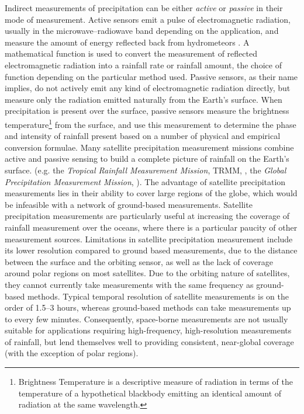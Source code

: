 Indirect measurements of precipitation can be either \textit{active} or \textit{passive} in their mode of measurement. Active sensors emit a pulse of electromagnetic radiation, usually in the microwave--radiowave band depending on the application, and measure the amount of energy reflected back from hydrometeors \citep{fabry2015radar}. A mathematical function is used to convert the measurement of reflected electromagnetic radiation into a rainfall rate or rainfall amount, the choice of function depending on the particular method used. Passive sensors, as their name implies, do not actively emit any kind of electromagnetic radiation directly, but measure only the radiation emitted naturally from the Earth's surface. When precipitation is present over the surface, passive sensors measure the brightness temperature\footnote{Brightness Temperature is a descriptive measure of radiation in terms of the temperature of a hypothetical blackbody emitting an identical amount of radiation at the same wavelength.} from the surface, and use this measurement to determine the phase and intensity of rainfall present based on a number of physical and empirical conversion formulae. Many satellite precipitation measurement missions combine active and passive sensing to build a complete picture of rainfall on the Earth's surface. (e.g. the \textit{Tropical Rainfall Measurement Mission}, TRMM, \citet{simpson1988proposed}, the \textit{Global Precipitation Measurement Mission}, \citet{hou2014global}). The advantage of satellite precipitation measurements lies in their ability to cover large regions of the globe, which would be infeasible with a network of ground-based measurements. Satellite precipitation measurements are particularly useful at increasing the coverage of rainfall measurement over the oceans, where there is a particular paucity of other measurement sources. Limitations in satellite precipitation measurement include its lower resolution compared to ground based measurements, due to the distance between the surface and the orbiting sensor, as well as the lack of coverage around polar regions on most satellites. Due to the orbiting nature of satellites, they cannot currently take measurements with the same frequency as ground-based methods. Typical temporal resolution of satellite measurements is on the order of 1.5--3 hours, whereas ground-based methods can take measurements up to every few minutes. Consequently, space-borne measurements are not usually suitable for applications requiring high-frequency, high-resolution measurements of rainfall, but lend themselves well to providing consistent, near-global coverage (with the exception of polar regions). 

